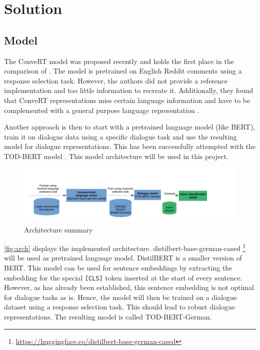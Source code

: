 \documentclass{article}
\begin{document}
\section{Solution}

\subsection{Model}
The ConveRT model \cite{henderson-etal-2020-convert} was proposed recently and holds the first place in the comparison of \cite{wu-xiong-2020-probing}. The model is pretrained
on English Reddit comments using a response selection task. However, the authors did not provide a reference
implementation and too little information to recreate it. Additionally, they found that ConveRT representations
miss certain language information and have to be complemented with a general purpose language representation \cite{casanueva-etal-2020-efficient}.

Another approach is then to start with a pretrained language model (like BERT), train it on dialogue data using a specific dialogue task and
use the resulting model for dialogue representations. This has been successfully attempted with the TOD-BERT model \cite{wu-etal-2020-tod}.
This model architecture will be used in this project.

\begin{figure}[h]
\includegraphics[width=1.2\textwidth]{dialog-arch}
\caption{Architecture summary}
\label{fig:arch}
\end{figure}

\autoref{fig:arch} displays the implemented architecture. distilbert-base-german-cased \footnote{\url{https://huggingface.co/distilbert-base-german-cased}} \cite{distilbert} will be used as pretrained language model. DistilBERT is a smaller version of BERT. This model can be used for sentence embeddings by extracting the embedding for the special \texttt{[CLS]} token inserted at the start of every sentence. However, as has already been established, this sentence embedding is not optimal for dialogue tasks as is. Hence, the model will then be trained on a dialogue dataset using a response selection task. This should lead to robust dialogue representations. The resulting model is called TOD-BERT-German.
\end{document}
